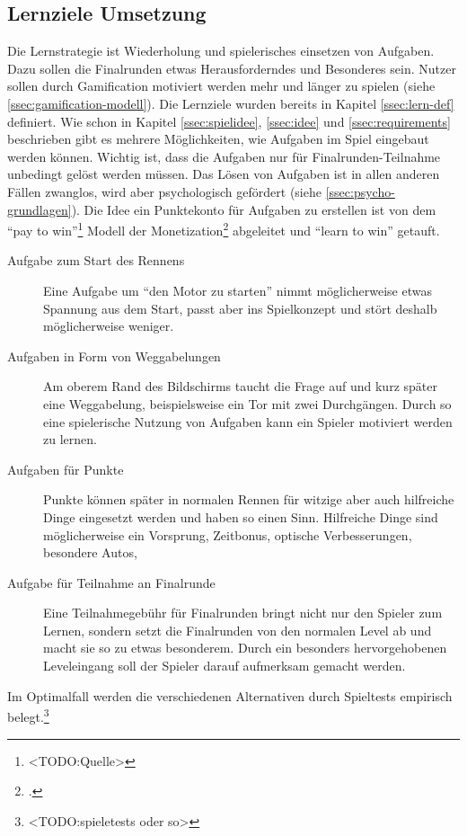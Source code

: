 \subsection{Lernziele Umsetzung}
	Die Lernstrategie ist Wiederholung und spielerisches einsetzen von Aufgaben. Dazu sollen die Finalrunden etwas Herausforderndes und Besonderes sein. Nutzer sollen durch Gamification motiviert werden mehr und länger zu spielen (siehe \ref{ssec:gamification-modell}).
	Die Lernziele wurden bereits in Kapitel \ref{ssec:lern-def} definiert.
	Wie schon in Kapitel \ref{ssec:spielidee}, \ref{ssec:idee} und \ref{ssec:requirements} beschrieben gibt es mehrere Möglichkeiten, wie Aufgaben im Spiel eingebaut werden können. Wichtig ist, dass die Aufgaben nur für Finalrunden-Teilnahme unbedingt gelöst werden müssen. Das Lösen von Aufgaben ist in allen anderen Fällen zwanglos, wird aber psychologisch gefördert (siehe \ref{ssec:psycho-grundlagen}).
	Die Idee ein Punktekonto für Aufgaben zu erstellen ist von dem \enquote{pay to win}\footnote{<TODO:Quelle>} Modell der Monetization\footcite{freemium} abgeleitet und \enquote{learn to win} getauft.
	\begin{description}
		\item[Aufgabe zum Start des Rennens]{
			Eine Aufgabe um \enquote{den Motor zu starten} nimmt möglicherweise etwas Spannung aus dem Start, passt aber ins Spielkonzept und stört deshalb möglicherweise weniger.
		}
		\item[Aufgaben in Form von Weggabelungen]{
			Am oberem Rand des Bildschirms taucht die Frage auf und kurz später eine Weggabelung, beispielsweise ein Tor mit zwei Durchgängen. Durch so eine spielerische Nutzung von Aufgaben kann ein Spieler motiviert werden zu lernen.
		}
		\item[Aufgaben für Punkte]{
			Punkte können später in normalen Rennen für witzige aber auch hilfreiche Dinge eingesetzt werden und haben so einen Sinn.
			Hilfreiche Dinge sind möglicherweise ein Vorsprung, Zeitbonus, optische Verbesserungen, besondere Autos,
		}
		\item[Aufgabe für Teilnahme an Finalrunde]{
			Eine Teilnahmegebühr für Finalrunden bringt nicht nur den Spieler zum Lernen, sondern setzt die Finalrunden von den normalen Level ab und macht sie so zu etwas besonderem. Durch ein besonders hervorgehobenen Leveleingang soll der Spieler darauf aufmerksam gemacht werden.
		}
	\end{description}
	Im Optimalfall werden die verschiedenen Alternativen durch Spieltests empirisch belegt.\footnote{<TODO:spieletests oder so>}


